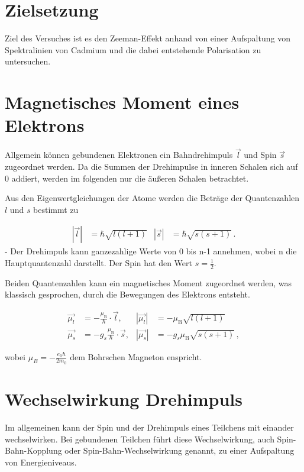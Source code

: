 \section{Zielsetzung}
Ziel des Versuches ist es den Zeeman-Effekt anhand von einer Aufspaltung von Spektralinien von Cadmium und die dabei entstehende Polarisation zu untersuchen.

\section{Magnetisches Moment eines Elektrons}
Allgemein können gebundenen Elektronen ein Bahndrehimpuls $\vec{l}$ und Spin $\vec{s}$ zugeordnet werden. Da die Summen der Drehimpulse in inneren Schalen sich auf 0 addiert, werden
im folgenden nur die äußeren Schalen betrachtet. 

\noindent
Aus den Eigenwertgleichungen der Atome werden die Beträge der Quantenzahlen $l$ und $s$ bestimmt zu 

\vspace{-25pt}
\begin{align}
    |\vec{l}| &= \hbar \sqrt{l(l+1)} & |\vec{s}| &= \hbar \sqrt{s(s+1)} \, .
\end{align}
-
\noindent
Der Drehimpuls kann ganzezahlige Werte von 0 bis n-1 annehmen, wobei n die Hauptquantenzahl darstellt. Der Spin hat den Wert $s=\frac{1}{2}$. 

\noindent
Beiden Quantenzahlen kann ein magnetisches Moment zugeordnet werden, was klassisch gesprochen, durch die Bewegungen des Elektrons entsteht. 

\vspace{-15pt}
\begin{align}
    \vec{\mu_l} &= - \frac{\mu_\text{B}}{\hbar} \cdot \vec{l}, & |\vec{\mu_l}|& = - \mu_\text{B} \sqrt{l(l+1)}\\
    \vec{\mu_s} &= - g_s \frac{\mu_\text{B}}{\hbar} \cdot \vec{s}, & |\vec{\mu_s}| &= - g_s \mu_\text{B} \sqrt{s(s+1)} \, ,
\end{align}

\noindent
wobei $\mu_B = -\frac{e_0 \hbar}{2 m_0}$ dem Bohrschen Magneton enspricht. 

\section{Wechselwirkung Drehimpuls}
Im allgemeinen kann der Spin und der Drehimpuls eines Teilchens mit einander wechselwirken. Bei gebundenen Teilchen führt 
diese Wechselwirkung, auch Spin-Bahn-Kopplung oder Spin-Bahn-Wechselwirkung genannt, zu einer Aufspaltung von Energieniveaus.

